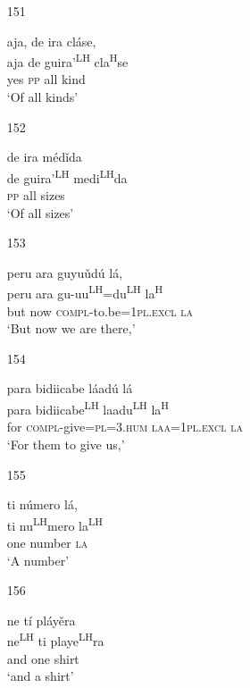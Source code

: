 \begin{itemize}
\item[151]
 
\glll   aja, de ira cl\'{a}se, \\
 aja de guira'\textsuperscript{LH} cla\textsuperscript{H}se\\
yes \textsc{pp} all kind\\
\glt `Of all kinds'
 



\item[152]
 
\glll   de ira m\'{e}d\v{i}da \\
 de guira'\textsuperscript{LH} medi\textsuperscript{LH}da\\
\textsc{pp} all sizes\\
\glt `Of all sizes'
 



\item[153]
 
\glll   peru ara guyu\v{u}d\'{u} l\'{a}, \\
peru ara gu-uu\textsuperscript{LH}=du\textsuperscript{LH} la\textsuperscript{H} \\
but now \textsc{compl}-to.be=\textsc{1pl.excl} \textsc{la}\\
\glt `But now we are there,'
 


\item[154]
 
\glll   para bidiicabe l\'{a}ad\'{u} l\'{a}\\
para bidiicabe\textsuperscript{LH} laadu\textsuperscript{LH} la\textsuperscript{H}\\
for \textsc{compl}-give=\textsc{pl}=\textsc{3.hum} \textsc{laa}=\textsc{1pl.excl} \textsc{la}\\
\glt `For them to give us,'
 



\item[155]
 
\glll   ti n\'{u}mero l\'{a}, \\
ti nu\textsuperscript{LH}mero la\textsuperscript{LH}\\
one number \textsc{la}\\
\glt `A number'
 


\item[156]
 
\glll   ne t\'{i} pl\'{a}y\v{e}ra\\
ne\textsuperscript{LH} ti playe\textsuperscript{LH}ra\\
and one shirt\\
\glt `and a shirt'
 



\end{itemize}
